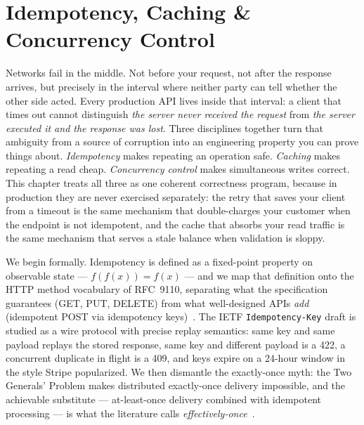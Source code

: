 \chapter{Idempotency, Caching \& Concurrency Control}
\label{ch:idempotency}

Networks fail in the middle. Not before your request, not after the response
arrives, but precisely in the interval where neither party can tell whether
the other side acted. Every production API lives inside that interval: a
client that times out cannot distinguish \emph{the server never received the
request} from \emph{the server executed it and the response was lost}. Three
disciplines together turn that ambiguity from a source of corruption into an
engineering property you can prove things about. \emph{Idempotency} makes
repeating an operation safe. \emph{Caching} makes repeating a read cheap.
\emph{Concurrency control} makes simultaneous writes correct. This chapter
treats all three as one coherent correctness program, because in production
they are never exercised separately: the retry that saves your client from a
timeout is the same mechanism that double-charges your customer when the
endpoint is not idempotent, and the cache that absorbs your read traffic is
the same mechanism that serves a stale balance when validation is sloppy.

We begin formally. Idempotency is defined as a fixed-point property on
observable state --- $f(f(x)) = f(x)$ --- and we map that definition onto the
HTTP method vocabulary of RFC~9110, separating what the specification
guarantees (GET, PUT, DELETE) from what well-designed APIs \emph{add}
(idempotent POST via idempotency keys)~\cite{rfc9110}. The IETF
\texttt{Idempotency-Key} draft is studied as a wire protocol with precise
replay semantics: same key and same payload replays the stored response,
same key and different payload is a 422, a concurrent duplicate in flight is
a 409, and keys expire on a 24-hour window in the style Stripe popularized.
We then dismantle the exactly-once myth: the Two Generals' Problem makes
distributed exactly-once delivery impossible, and the achievable substitute
--- at-least-once delivery combined with idempotent processing --- is what
the literature calls \emph{effectively-once}~\cite{kleppmann2017ddia}.

